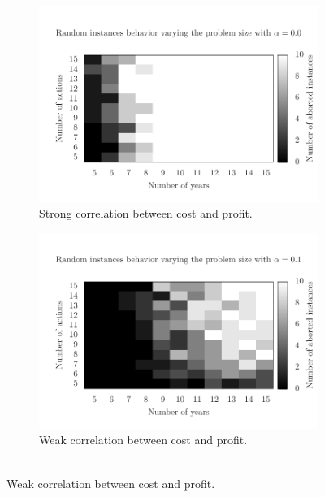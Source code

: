 \begin{figure}
  \begin{subfigure}{0.45\textwidth}
    \includegraphics[scale=0.5, trim=0.75cm 0cm 0 2cm, clip=true]{imgs/very_hard.pdf}
    \caption{Strong correlation between cost and profit.}
    \label{fig:time1}
  \end{subfigure}
  \qquad
  \begin{subfigure}{0.45\textwidth}
    \includegraphics[scale=0.5, trim=0.75cm 0cm 0 2cm, clip=true]{imgs/hard.pdf}
    \caption{Weak correlation between cost and profit. \\ $\,$ }
    \label{fig:time2}
  \end{subfigure}
\end{figure}



